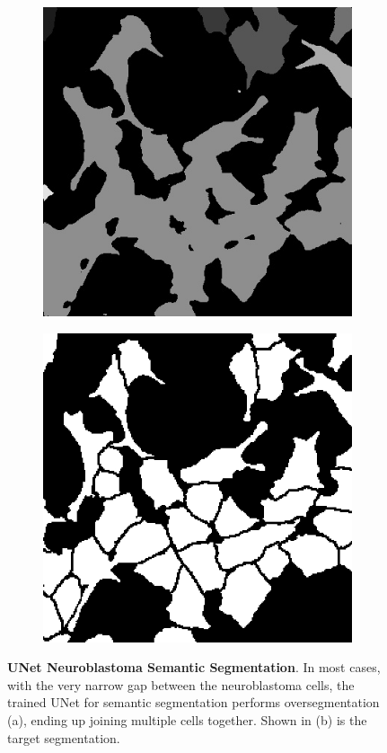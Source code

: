 \documentclass[journal]{IEEEtran}
\begin{document}
\begin{figure}
\centering
\begin{subfigure}[b]{0.45\linewidth}
\includegraphics[width=\linewidth]{unet/110115-instance.jpg}
\caption{}
\end{subfigure}
\begin{subfigure}[b]{0.45\linewidth}
\includegraphics[width=\linewidth]{unet/110115.jpg}
\caption{}
\end{subfigure}
\caption{\textbf{UNet Neuroblastoma Semantic Segmentation}. In most cases, with the very narrow gap between the neuroblastoma cells, the trained UNet for semantic segmentation performs oversegmentation (a), ending up joining multiple cells together. Shown in (b) is the target segmentation.}
\label{fig:unet_results}
\end{figure}
\end{document}
